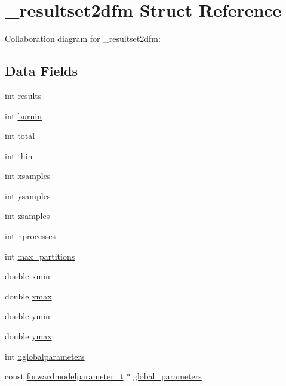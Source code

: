 \hypertarget{struct__resultset2dfm}{}\section{\+\_\+resultset2dfm Struct Reference}
\label{struct__resultset2dfm}


Collaboration diagram for \+\_\+resultset2dfm\+:
\subsection*{Data Fields}
\begin{DoxyCompactItemize}
\item 
int \hyperlink{struct__resultset2dfm_af5de4920c584494e6366a07cb342f657}{results}
\item 
int \hyperlink{struct__resultset2dfm_a6b8c999bec94e86b0ddeb2ed0dd32340}{burnin}
\item 
int \hyperlink{struct__resultset2dfm_a152dc4e7eddb757b55fd65fe646e1016}{total}
\item 
int \hyperlink{struct__resultset2dfm_a862ef0a2c5de1e5343bdba2199ed766c}{thin}
\item 
int \hyperlink{struct__resultset2dfm_a1ab88a600539720d2d868411fb7f5815}{xsamples}
\item 
int \hyperlink{struct__resultset2dfm_ab22b1f3b87ab2bd5063bda721d7514dc}{ysamples}
\item 
int \hyperlink{struct__resultset2dfm_a1530a46f54a76c820b6a1a8180972c50}{zsamples}
\item 
int \hyperlink{struct__resultset2dfm_ad178d8e2517deb7b5cfea4ffd22561be}{nprocesses}
\item 
int \hyperlink{struct__resultset2dfm_aa3c389a7b9b79e145521bb169c156ef5}{max\+\_\+partitions}
\item 
double \hyperlink{struct__resultset2dfm_a5aa4092375b3b85dcb9c259f2b66e373}{xmin}
\item 
double \hyperlink{struct__resultset2dfm_aa9a21977e9a138037c458dd3ba12320d}{xmax}
\item 
double \hyperlink{struct__resultset2dfm_a7aa08ca18205eeba24fe752351436b93}{ymin}
\item 
double \hyperlink{struct__resultset2dfm_ab3acec5e7979e516689f4e724f70a537}{ymax}
\item 
int \hyperlink{struct__resultset2dfm_a097344b755a779249614ba5e821f0ae7}{nglobalparameters}
\item 
const \hyperlink{forwardmodelparameter_8h_a18a7d2fd51fab097145725d83ac328e3}{forwardmodelparameter\+\_\+t} $\ast$ \hyperlink{struct__resultset2dfm_ae393bd44ecda076e9a96f193df78e7fd}{global\+\_\+parameters}

\end{DoxyCompactItemize}
